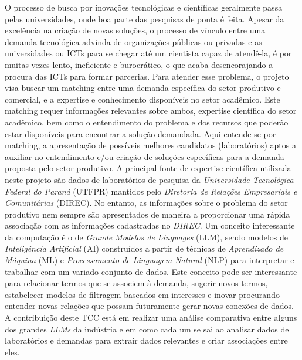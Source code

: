 \begin{resumoutfpr}
    O processo de busca por inovações tecnológicas e científicas geralmente passa pelas universidades, onde boa parte das pesquisas de ponta é feita. Apesar da excelência na criação de novas soluções, o processo de vínculo entre uma demanda tecnológica advinda de organizações públicas ou privadas e as universidades ou ICTs para se chegar até um cientista capaz de atendê-la, é por muitas vezes lento, ineficiente e burocrático, o que acaba desencorajando a procura das ICTs para formar parcerias. Para atender esse problema, o projeto visa buscar um matching entre uma demanda específica do setor produtivo e comercial, e a expertise e conhecimento disponíveis no setor acadêmico. Este matching requer informações relevantes sobre ambos, expertise científica do setor acadêmico, bem como o entendimento do problema e dos recursos que poderão estar disponíveis para encontrar a solução demandada. Aqui entende-se por matching, a apresentação de possíveis melhores candidatos (laboratórios) aptos a auxiliar no entendimento e/ou criação de soluções específicas para a demanda proposta pelo setor produtivo. A principal fonte de expertise científica utilizada neste projeto são dados de laboratórios de pesquisa da \emph{Universidade Tecnológica Federal do Paraná} (UTFPR) mantidos pelo \emph{Diretoria de Relações Empresariais e Comunitárias} (DIREC). No entanto, as informações sobre o problema do setor produtivo nem sempre são apresentados de maneira a proporcionar uma rápida associação com as informações cadastradas no \emph{DIREC}.
    Um conceito interessante da computação é o de \emph{Grande Modelos de Linguages} (LLM), sendo modelos de \emph{Inteligência Artificial} (AI) construídos a partir de técnicas de \emph{Aprendizado de Máquina} (ML) e \emph{Processamento de Linguagem Natural} (NLP) para interpretar e trabalhar com um variado conjunto de dados. Este conceito pode ser interessante para relacionar termos que se associem à demanda, sugerir novos termos, estabelecer modelos de filtragem baseados em interesses e inovar procurando entender novas relações que possam futuramente gerar novas conexões de dados. A contribuição deste TCC está em realizar uma análise comparativa entre alguns dos grandes \emph{LLMs} da indústria e em como cada um se sai ao analisar dados de laboratórios e demandas para extrair dados relevantes e criar associações entre eles.
\end{resumoutfpr}